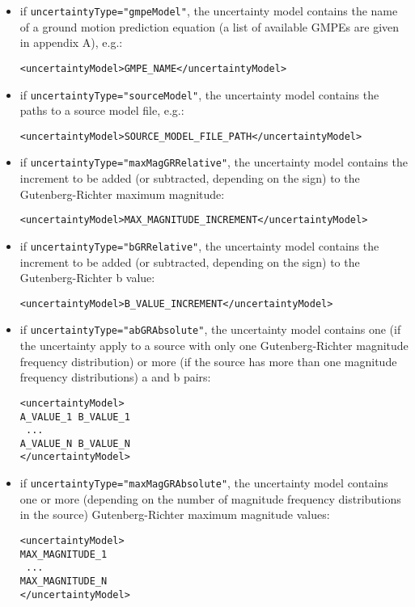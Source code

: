 \begin{itemize}
\item if \Verb+uncertaintyType="gmpeModel"+, the uncertainty model contains the name of a ground motion prediction equation (a list of available GMPEs are given in appendix A), e.g.:
\begin{Verbatim}[frame=single, commandchars=\\\{\}]
<uncertaintyModel>GMPE_NAME</uncertaintyModel>
\end{Verbatim}
\item if \Verb+uncertaintyType="sourceModel"+, the uncertainty model contains the paths to a source model file, e.g.:
\begin{Verbatim}[frame=single, commandchars=\\\{\}]
<uncertaintyModel>SOURCE_MODEL_FILE_PATH</uncertaintyModel>
\end{Verbatim}
\item if \Verb+uncertaintyType="maxMagGRRelative"+, the uncertainty model contains the increment to be added (or subtracted, depending on the sign) to the Gutenberg-Richter maximum magnitude:
\begin{Verbatim}[frame=single, commandchars=\\\{\}]
<uncertaintyModel>MAX_MAGNITUDE_INCREMENT</uncertaintyModel>
\end{Verbatim}
\item if \Verb+uncertaintyType="bGRRelative"+, the uncertainty model contains the increment to be added (or subtracted, depending on the sign) to the Gutenberg-Richter b value:
\begin{Verbatim}[frame=single, commandchars=\\\{\}]
<uncertaintyModel>B_VALUE_INCREMENT</uncertaintyModel>
\end{Verbatim}
\item if \Verb+uncertaintyType="abGRAbsolute"+, the uncertainty model contains one (if the uncertainty apply to a source with only one Gutenberg-Richter magnitude frequency distribution) or more (if the source has more than one magnitude frequency distributions) a and b pairs:
\begin{Verbatim}[frame=single, commandchars=\\\{\}]
<uncertaintyModel>
A_VALUE_1 B_VALUE_1
 ... 
A_VALUE_N B_VALUE_N
</uncertaintyModel>
\end{Verbatim}
\item if \Verb+uncertaintyType="maxMagGRAbsolute"+, the uncertainty model contains one or more (depending on the number of magnitude frequency distributions in the source) Gutenberg-Richter maximum magnitude values:
\begin{Verbatim}[frame=single, commandchars=\\\{\}]
<uncertaintyModel>
MAX_MAGNITUDE_1
 ... 
MAX_MAGNITUDE_N
</uncertaintyModel>
\end{Verbatim}
\end{itemize}
